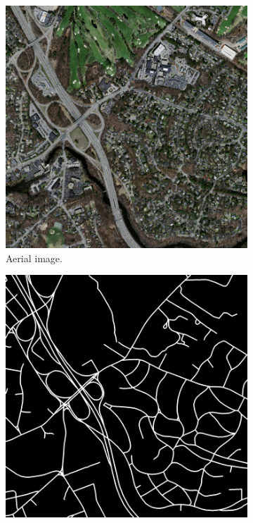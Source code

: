 \begin{figure}
\begin{subfigure}{0.48\textwidth}
\includegraphics[width=\linewidth]{figs/datasets/Mass_roads_data_example2.png}
\caption{Aerial image.} \label{fig:mass_roads_example_data}
\end{subfigure}
\hspace*{\fill} %
\begin{subfigure}{0.48\textwidth}
\includegraphics[width=\linewidth]{figs/datasets/Mass_roads_label_example2.png}

\end{subfigure}
\end{figure}
